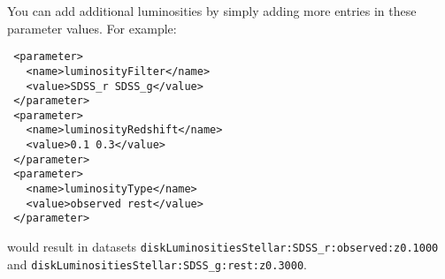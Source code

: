 You can add additional luminosities by simply adding more entries in these parameter values. For example:
\begin{verbatim}
 <parameter>
   <name>luminosityFilter</name>
   <value>SDSS_r SDSS_g</value>
 </parameter>
 <parameter>
   <name>luminosityRedshift</name>
   <value>0.1 0.3</value>
 </parameter>
 <parameter>
   <name>luminosityType</name>
   <value>observed rest</value>
 </parameter>
\end{verbatim}
would result in datasets {\tt diskLuminositiesStellar:SDSS\_r:observed:z0.1000} and {\tt diskLuminositiesStellar:SDSS\_g:rest:z0.3000}. 
